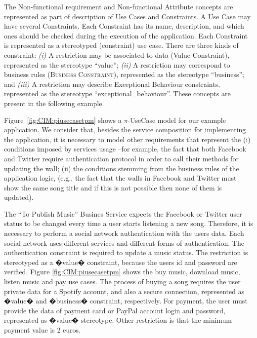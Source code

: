  The {\sc Non-functional requirement} and {\sc Non-functional Attribute} concepts are represented as part of description of {\sc Use Cases} and {\sc Constraints}. 
A {\sc Use Case} may have several {\sc Constraints}. Each {\sc Constraint} has its name, description, and which ones should be checked during the execution of the application. 
Each {\sc Constraint} is represented as a stereotyped ({\sf constraint}) use case. 
There are three kinds of constraint:
\textit{(i)} A restriction may be associated to data ({\sc Value Constraint}), represented as the stereotype ``value''; 
\textit{(ii)} A restriction may correspond to business rules (\textsc{Business Constraint}), represented as the stereotype {\sf ``business''}; and 
\textit{(iii)} A restriction may describe {\sc Exceptional Behaviour} constraints, represented as the stereotype {\sf ``exceptional\_behaviour''}.
These concepts are present in the following example.

\begin{example}\label{ex:toPublicMusic2}
Figure~\ref{fig:CIM:piusecasetpm} shows a $\pi$-UseCase model for our example application.
We consider that, besides the service composition for implementing the application, it is necessary to model  other requirements that represent the (i) conditions imposed by services usage --for example, the fact that both Facebook and Twitter require authentication protocol in order to call their methods for updating the wall; (ii) the conditions stemming from the business rules of the application logic, (e.g., the fact that the walls in Facebook and Twitter must show the same song title and if this is not possible then none of them is updated). 
 
The ``To Publish Music'' Busines Service expects  the Facebook or Twitter user status to be changed every time a user starts listening a new song.
  Therefore, it is necessary to perform a social network authentication with the users data. Each social network uses different services and different forms of authentication. The authentication constraint is required to update a music status. The restriction is stereotyped as a �value� constraint, because the users id and password are verified.  Figure \ref{fig:CIM:piusecasetpm} shows the buy music, download music, listen music and pay use cases. The process of buying a song requires the user private data for a Spotify account, and also a secure connection, represented as �value� and �business� constraint, respectively. For payment, the user must provide the data of payment card or PayPal account login and password, represented as �value� stereotype. Other restriction is that the minimum payment value is 2 euros.
\end{example} 

